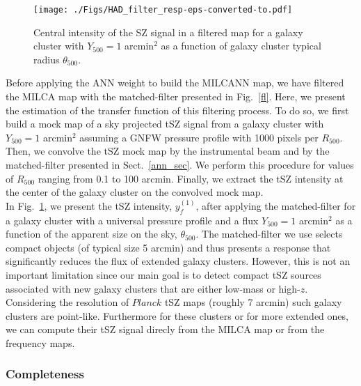\documentclass[traditabstract,a4,twocolumn]{aa}
\begin{document}
\begin{figure}[!th]
\begin{center}
\texttt{[image: ./Figs/HAD\_filter\_resp-eps-converted-to.pdf]}
\caption{Central intensity of the SZ signal in a filtered map for a galaxy cluster with
  $Y_{500} = 1$ arcmin$^2$ as a
  function of galaxy cluster typical radius $\theta_{500}$.}
\label{fresp}
\end{center}
\end{figure}
Before applying the ANN weight to build the MILCANN map, we have filtered the MILCA map with the matched-filter presented in Fig.~\ref{fl}.  Here, we present the
estimation of the transfer function of this filtering process.
To do so, we first build a mock map of a sky projected tSZ signal from a galaxy
cluster with $Y_{500} = 1$ arcmin$^2$ assuming a GNFW pressure profile
\citep{arn10} with 1000 pixels per $R_{500}$.  Then, we convolve
the tSZ mock map by the instrumental beam and by the matched-filter
presented in Sect.~\ref{ann_sec}.  We perform this procedure for
values of $R_{500}$ ranging from 0.1 to 100 arcmin.  Finally, we
extract the tSZ intensity at the center of the galaxy cluster on the
convolved mock map.\\ 
In Fig.~\ref{fresp}, we present the tSZ
intensity, $y^{(1)}_f$, after applying the matched-filter for a
galaxy cluster with a universal pressure profile and a flux $Y_{500} = 1$ arcmin$^2$ as a function of the apparent size on the sky, $\theta_{500}$. The matched-filter we
use selects compact objects (of typical size 5 arcmin) and thus presents a response that 
significantly reduces the flux of extended galaxy clusters. However, this is not an important limitation
  since our main goal is to detect compact tSZ sources associated with
  new galaxy clusters that are either low-mass or
  high-$z$. Considering the resolution of $Planck$ tSZ maps (roughly 7
  arcmin) such galaxy clusters are point-like. Furthermore for these
  clusters or for more extended ones, we can compute their tSZ signal
  direcly from the MILCA map or from the frequency maps.


\subsubsection{Completeness}
\end{document}
